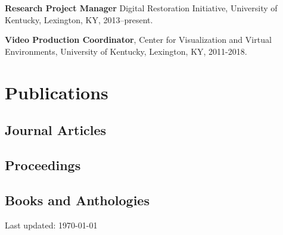 \documentclass[letterpaper]{article}
\def\footerlink{}
\renewenvironment{itemize}{
  \begin{list}{}{
    \setlength{\leftmargin}{1.5em}
  }
}{
  \end{list}
}
\begin{document}
\begin{itemize}
\item \textbf{Research Project Manager} Digital Restoration Initiative, University of Kentucky, Lexington, KY, 2013--present.

\item \textbf{Video Production Coordinator}, Center for Visualization and Virtual Environments, University of Kentucky, Lexington, KY, 2011-2018.
\end{itemize}


\section*{Publications}
\nocite{*}

\subsection*{Journal Articles}
\printbibliography[type={article}, keyword={csp}, heading=none]

\subsection*{Proceedings}
\printbibliography[type={inproceedings}, keyword={csp}, heading=none]

\subsection*{Books and Anthologies}
\printbibliography[filter=books, keyword={csp}, heading=none]

\bigskip

\begin{center}
  \begin{footnotesize}
    Last updated: \today \\
    \href{\footerlink}{\texttt{\footerlink}}
  \end{footnotesize}
\end{center}
\end{document}
